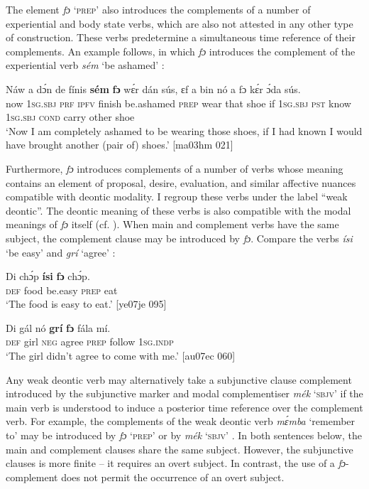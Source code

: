 The element\textit{ fɔ} ‘\textsc{prep}’ also introduces the complements of a number of experiential and body state verbs, which are also not attested in any other type of construction. These verbs predetermine a simultaneous time reference of their complements. An example follows, in which \textit{fɔ} introduces the complement of the experiential verb \textit{sém} ‘be ashamed’ :


\ea%
    \label{ex:key:1387}
    \gll Náw    a    dɔ́n    de  fínis    \textbf{sém}      \textbf{fɔ}  wɛ́r    dán    sús,
ɛf  a    bin  nó    a    fɔ  kɛ́r    ɔ́da    sús.\\
now    \textsc{1sg.sbj}  \textsc{prf}    \textsc{ipfv}  finish  be.ashamed  \textsc{prep}  wear  that    shoe
if  \textsc{1sg.sbj}  \textsc{pst}  know  \textsc{1sg.sbj}  \textsc{cond}  carry  other  shoe\\

\glt ‘Now I am completely ashamed to be wearing those shoes, if I had known
I would have brought another (pair of) shoes.’ [ma03hm 021]
\z

Furthermore, \textit{fɔ} introduces complements of a number of verbs whose meaning contains an element of proposal, desire, evaluation, and similar affective nuances compatible with deontic modality. I regroup these verbs under the label “weak deontic”. The deontic meaning of these verbs is also compatible with the modal meanings of \textit{fɔ} itself (cf. ). When main and complement verbs have the same subject, the complement clause may be introduced by \textit{fɔ}. Compare the verbs \textit{ísi} ‘be easy’  and \textit{grí} ‘agree’ : 


\ea%
    \label{ex:key:1388}
    \gll Di  chɔ́p  \textbf{ísi}    \textbf{fɔ} chɔ́p.\\
\textsc{def}  food    be.easy  \textsc{prep}  eat\\

\glt ‘The food is easy to eat.’ [ye07je 095]
\z


\ea%
    \label{ex:key:1389}
    \gll Di  gál    nó  \textbf{grí}    \textbf{fɔ} fála    mí.\\
\textsc{def}  girl    \textsc{neg}  agree  \textsc{prep}  follow  \textsc{1sg.indp}\\

\glt ‘The girl didn’t agree to come with me.’ [au07ec 060]
\z

Any weak deontic verb may alternatively take a subjunctive clause complement introduced by the subjunctive marker and modal complementiser \textit{mék} ‘\textsc{sbjv}’ if the main verb is understood to induce a posterior time reference over the complement verb. For example, the complements of the weak deontic verb \textit{mɛ́mba} ‘remember to’ may be introduced by \textit{fɔ} ‘\textsc{prep}’  or by \textit{mék} ‘\textsc{sbjv}’ . In both sentences below, the main and complement clauses share the same subject{\fff}. However, the subjunctive clauses is more finite – it requires an overt subject. In contrast, the use of a \textit{fɔ}-complement does not permit the occurrence of an overt subject.


